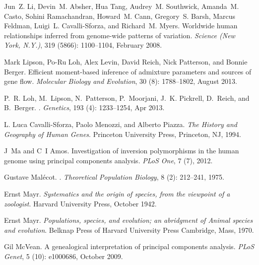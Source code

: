 \documentclass[10pt,letterpaper]{article}
\begin{document}
\begin{thebibliography}{80}
Jun~Z. Li, Devin~M. Absher, Hua Tang, Audrey~M. Southwick, Amanda~M. Casto,
  Sohini Ramachandran, Howard~M. Cann, Gregory~S. Barsh, Marcus Feldman,
  Luigi~L. Cavalli-Sforza, and Richard~M. Myers.
\newblock Worldwide human relationships inferred from genome-wide patterns of
  variation.
\newblock \emph{Science (New York, N.Y.)}, 319 (5866):
  1100--1104, February 2008.

Mark Lipson, Po-Ru Loh, Alex Levin, David Reich, Nick Patterson, and Bonnie
  Berger.
\newblock Efficient moment-based inference of admixture parameters and sources
  of gene flow.
\newblock \emph{Molecular Biology and Evolution}, 30 (8):
  1788--1802, August 2013.

P.~R. Loh, M.~Lipson, N.~Patterson, P.~Moorjani, J.~K. Pickrell, D.~Reich, and
  B.~Berger.
.
\newblock \emph{Genetics}, 193 (4): 1233--1254, Apr 2013.

L. Luca Cavalli-Sforza, Paolo Menozzi, and Alberto Piazza.
\newblock \emph{The History and Geography of Human Genes}.
\newblock Princeton University Press, Princeton, NJ, 1994.

J~Ma and C~I Amos.
\newblock Investigation of inversion polymorphisms in the human genome using
  principal components analysis.
\newblock \emph{PLoS One}, 7 (7), 2012.

Gustave Mal\'{e}cot.
.
\newblock \emph{Theoretical Population Biology}, 8 (2):
  212--241, 1975.

Ernst Mayr.
\newblock \emph{{Systematics and the origin of species, from the viewpoint of a
  zoologist}}.
\newblock Harvard University Press, October 1942.

Ernst Mayr.
\newblock \emph{Populations, species, and evolution; an abridgment of Animal
  species and evolution}.
\newblock Belknap Press of Harvard University Press Cambridge, Mass, 1970.

Gil McVean.
\newblock A genealogical interpretation of principal components analysis.
\newblock \emph{{PLoS} Genet}, 5 (10): e1000686, October
  2009.


\end{thebibliography}
\end{document}
